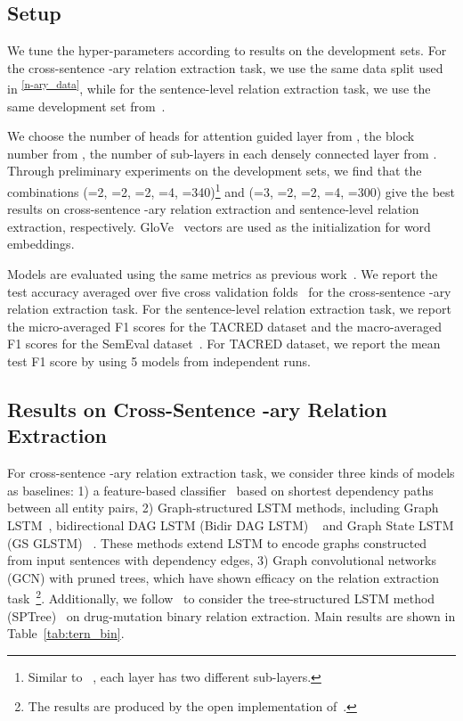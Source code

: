 \documentclass[11pt,a4paper]{article}
\begin{document}
\subsection{Setup}
We tune the hyper-parameters according to results on the development sets. For the cross-sentence -ary relation extraction task, we use the same data split  used in \citep{Song2018NaryRE}\textsuperscript{\ref{n-ary_data}}, while for the sentence-level relation extraction task, we use the same development set from~\citep{Zhang2018GraphCO}.

We choose the number of heads  for attention guided layer from , the block number  from , the number of sub-layers  in each densely connected layer from . Through preliminary experiments on the development sets, we find that the combinations (=2, =2, =2, =4, =340)\footnote{Similar to ~\citep{dcgcnforgraph2seq19guo}, each layer has two different sub-layers.} and (=3, =2, =2, =4, =300) give the best results on cross-sentence -ary relation extraction and sentence-level relation extraction, respectively. GloVe~\citep{Pennington2014GloveGV} vectors are used as the initialization for word embeddings.

Models are evaluated using the same metrics as previous work~\citep{Song2018NaryRE, Zhang2018GraphCO}. We report the test accuracy averaged over five cross validation folds~\citep{Song2018NaryRE} for the cross-sentence -ary relation extraction task. For the sentence-level relation extraction task, we report the micro-averaged F1 scores for the TACRED dataset and the macro-averaged F1 scores for the SemEval dataset~\citep{Zhang2018GraphCO}. For TACRED dataset, we report the mean test F1 score by using 5 models from independent runs.

\subsection{Results on Cross-Sentence -ary Relation Extraction}
For cross-sentence -ary relation extraction task, we consider three kinds of models as baselines: 1) a feature-based classifier~\citep{Quirk2017DistantSF} based on shortest dependency paths between all entity pairs, 2) Graph-structured LSTM methods, including Graph LSTM~\citep{Peng2017CrossSentenceNR}, bidirectional DAG LSTM (Bidir DAG LSTM) ~\citep{Song2018NaryRE} and  Graph State LSTM (GS GLSTM) ~\citep{Song2018NaryRE}. These methods  extend LSTM to encode graphs constructed from input sentences with dependency edges,  3) Graph  convolutional  networks (GCN) with pruned trees,  which have shown efficacy on the  relation extraction task~\citep{Zhang2018GraphCO}\footnote{The results are produced by the open implementation of~\citet{Zhang2018GraphCO}.}.  Additionally, we follow~\citep{Song2018NaryRE} to consider the tree-structured LSTM method (SPTree)~\citep{Miwa2016EndtoEndRE} on drug-mutation binary relation extraction. Main results are shown in Table~\ref{tab:tern_bin}.
\end{document}
